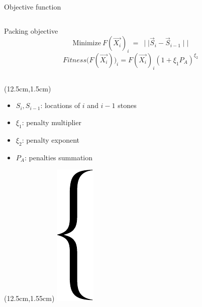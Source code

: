 \documentclass{EESD}
\begin{document}
\begin{frame}[t]{Objective function}\vspace{1pt}
\begin{columns}
\begin{column}{0.49\textwidth}
\begin{overprint}
\begin{block}{Packing objective}
    \begin{equation*}
        \text{Minimize}~F(\vec{X_i})_{i}~=~\mid\mid \vec{S}_{i} - \vec{S}_{i-1} \mid\mid
    \end{equation*}
    \begin{equation*}
        Fitness\Big(F(\vec{X_i})\Big)_{i} = F(\vec{X_i})_{i}(1 + \xi_{1} P_A)^{\xi_{2}}
    \end{equation*}
\end{block}
\end{overprint}
\end{column}
\end{columns}
\begin{textblock*}{3.2cm}(12.5cm,1.5cm)
    \tiny{
    \begin{itemize}
        \item $S_{i}, S_{i-1}$: locations of $i$ and $i-1$ stones
        \item $\xi_{1}$: penalty multiplier
        \item $\xi_{2}$: penalty exponent
        \item $P_{A}$: penalties summation
    \end{itemize}
    }
\end{textblock*}
\begin{textblock*}{3cm}(12.5cm,1.55cm)
    \includegraphics[height = 0.6\linewidth]{brace.pdf}
\end{textblock*}

\end{frame}
\end{document}
